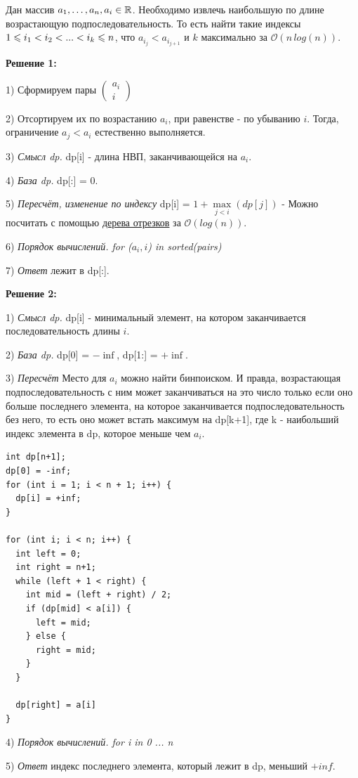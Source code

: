\Task Дан массив $a_{1}, \dots , a_{n}, a_{i} \in \mathbb{R}$. Необходимо извлечь наибольшую по
длине возрастающую подпоследовательность. То есть найти такие
индексы $1 \leqslant i_{1} < i_{2} < . . . < i_{k} \leqslant n$, что $a_{i_{j}} < a_{i_{j+1}}$ и $k$ максимально за $\mathcal{O}(n\,log(n))$.

\textbf{Решение 1:}

1) Сформируем пары $\begin{pmatrix}
a_{i}\\
i
\end{pmatrix}$

2) Отсортируем их по возрастанию $a_{i}$, при равенстве - по убыванию $i$. Тогда, ограничение $a_{j} < a_{i}$ естественно выполняется.

3) \textit{Смысл dp.} dp[i] - длина НВП, заканчивающейся на $a_{i}$.

4) \textit{База dp.} dp[:] = 0.

5) \textit{Пересчёт, изменение по индексу} dp[i] = $1 + \max \limits_{j < i}(dp[j])$ - Можно посчитать с помощью \hyperlink{segtree}{дерева отрезков} за $\mathcal{O}(log(n))$.

6) \textit{Порядок вычислений. for ($a_i, i$) in sorted(pairs)} 

7) \textit{Ответ} лежит в dp[:].


\textbf{Решение 2:}

1) \textit{Смысл dp.} dp[i] - минимальный элемент, на котором заканчивается последовательность длины $i$.

2) \textit{База dp.} dp[0] = $-\inf$, dp[1:] = $+\inf$.

3) \textit{Пересчёт} Место для $a_i$ можно найти бинпоиском. И правда, возрастающая подпоследовательность с ним может заканчиваться на это число только если оно больше последнего элемента, на которое заканчивается подпоследовательность без него, то есть оно может встать максимум на dp[k+1], где k - наибольший индекс элемента в dp, которое меньше чем $a_i$.

\begin{lstlisting}
int dp[n+1];
dp[0] = -inf;
for (int i = 1; i < n + 1; i++) {
  dp[i] = +inf;
}

for (int i; i < n; i++) {
  int left = 0;
  int right = n+1;
  while (left + 1 < right) {
    int mid = (left + right) / 2;
    if (dp[mid] < a[i]) {
      left = mid;
    } else {
      right = mid;
    }
  }

  dp[right] = a[i]
}
\end{lstlisting}
4) \textit{Порядок вычислений. for i in 0 ... n} 

5) \textit{Ответ} индекс последнего элемента, который лежит в dp, меньший $+inf$.
\pagebreak